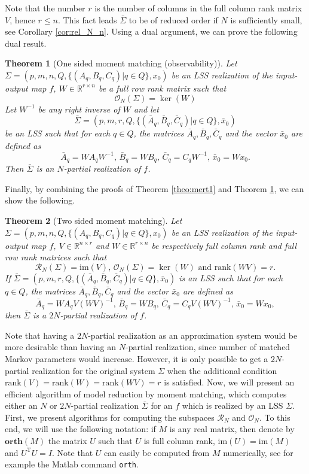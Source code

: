 \documentclass[journal]{IEEEtran}
\newcommand{\IM}{\mathrm{im}}
\newcommand{\Rank}{\mathrm{rank}}
\newtheorem{Theorem}{Theorem}
\begin{document}
Note that the number $r$ is the number of columns in the full column rank matrix $V$, hence $r \leq n$. This fact leads $\bar{\Sigma}$ to be of reduced order if $N$ is sufficiently small, see Corollary \ref{cor:rel_N_n}. Using a dual argument, we can prove the following dual result.

\begin{Theorem}[One sided moment matching (observability)] \label{theo:mert2}
	Let $\Sigma=(p,m,n,Q,\{(A_q,B_q,C_q)|q \in Q\},x_0)$ be an LSS realization of the input-output map $f$, $W \in \mathbb{R}^{r \times n}$ be a full row rank matrix such that
	\[
	\mathscr{O}_{N}(\Sigma) = \ker (W)
	\]
	Let $W^{-1}$ be any right inverse of $W$ and let
	\[
	\bar{\Sigma}=(p,m,r,Q,\{(\bar{A}_q,\bar{B}_q,\bar{C}_q)|q \in Q\},\bar{x}_0)
	\]
	be an LSS such that for each $q \in Q$, the matrices $\bar{A}_q,\bar{B}_q,\bar{C}_q$ and the vector $\bar{x}_0$ are defined as
	\[
	\bar{A}_q=WA_qW^{-1} \mbox{, } \bar{B}_q=WB_q \mbox{, } \bar{C}_q=C_qW^{-1} \mbox{, } \bar{x}_0=Wx_0.
	\]
	Then $\bar{\Sigma}$ is an $N$-partial realization of $f$.
\end{Theorem}

Finally, by combining the proofs of Theorem \ref{theo:mert1} and Theorem \ref{theo:mert2}, we can show the following.

\begin{Theorem}[Two sided moment matching] \label{theo:mert3}
	Let $\Sigma=(p,m,n,Q,\{(A_q,B_q,C_q)|q \in Q\},x_0)$ be an LSS realization of the input-output map $f$, $V \in \mathbb{R}^{n \times r}$ and $W \in \mathbb{R}^{r \times n}$ be respectively full column rank and full row rank matrices such that
	\[
	\mathscr{R}_{N}(\Sigma) = \IM (V) \mbox{, } \mathscr{O}_{N}(\Sigma) = \ker (W) \mbox{ and } \Rank(WV)=r.
	\]
If $\bar{\Sigma}=(p,m,r,Q,\{(\bar{A}_q,\bar{B}_q,\bar{C}_q)|q \in Q\},\bar{x}_0)$ is an LSS such that for each $q \in Q$, the matrices $\bar{A}_q,\bar{B}_q,\bar{C}_q$ and the vector $\bar{x}_0$ are defined as
	\[
	\bar{A}_q=WA_qV(WV)^{-1} \mbox{, } \bar{B}_q=WB_q \mbox{, } \bar{C}_q=C_qV(WV)^{-1} \mbox{, } \bar{x}_0=Wx_0,
	\]
	then $\bar{\Sigma}$ is a $2N$-partial realization of $f$.
\end{Theorem}

Note that having a $2N$-partial realization as an approximation system would be more desirable than having an $N$-partial realization, since number of matched Markov parameters would increase. However, it is only possible to get a $2N$-partial realization for the original system $\Sigma$ when the additional condition $\Rank(V)=\Rank(W)=\Rank(WV)=r$ is satisfied. Now, we will present an efficient algorithm of model reduction by moment matching, which computes either an $N$ or $2N$-partial realization $\bar{\Sigma}$ for an $f$ which is realized by an LSS $\Sigma$. First, we present algorithms for computing the subspaces $\mathscr{R}_N$ and $\mathscr{O}_N$. To this end, we will use the following notation: if $M$ is any real matrix, then denote by $\mathbf{orth}(M)$ the matrix $U$ such that $U$ is full column rank, $\IM (U)=\IM (M)$ and $U^{\mathrm{T}}U=I$. Note that $U$ can easily be computed from $M$ numerically, see for example the Matlab command \texttt{orth}.
\end{document}
